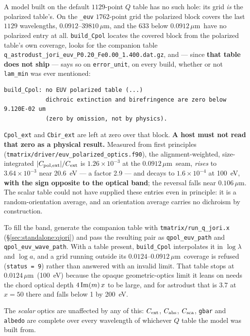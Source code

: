 \documentclass{my_memo}
\newcommand{\code}[1]{\texttt{#1}}
\newcommand{\um}{\ensuremath{\,\mu\mathrm{m}}}
\begin{document}
A model built on the default $1129$-point $Q$ table has no such hole: its grid
\emph{is} the polarized table's. On the \code{\_euv} $1762$-point grid the
polarized block covers the last
$1129$ wavelengths, $0.0912$--$39810$\um, and the $633$ below $0.0912$\um\ have
no polarized entry at all. \code{build\_Cpol} locates the covered block from the
polarized table's own coverage, looks for the companion table
\code{q\_astrodust\_jori\_euv\_P0.20\_Fe0.00\_1.400.dat.gz}, and --- since
\textbf{that table does not ship} --- says so on \code{error\_unit}, on every
build, whether or not \code{lam\_min} was ever mentioned:
\begin{lstlisting}[style=sh]
build_Cpol: no EUV polarized table (...)
            dichroic extinction and birefringence are zero below 9.120E-02 um
            (zero by omission, not by physics).
\end{lstlisting}
\code{Cpol\_ext} and \code{Cbir\_ext} are left at zero over that block.
\textbf{A host must not read that zero as a physical result.} Measured from
first principles (\code{tmatrix/driver/euv\_polarized\_optics.f90}), the
alignment-weighted, size-integrated $|C_{\rm pol,ext}|/C_{\rm ext}$ is
$1.26\times10^{-3}$ at the $0.0912$\um\ seam, \emph{rises} to
$3.64\times10^{-3}$ near \SI{20.6}{\electronvolt} --- a factor 2.9 --- and
decays to $1.6\times10^{-4}$ at \SI{100}{\electronvolt}, \textbf{with the sign
opposite to the optical band}; the reversal falls near $0.106$\um. The scalar
table could not have supplied these entries even in principle: it is a
random-orientation average, and an orientation average carries no dichroism by
construction.

To fill the band, generate the companion table with
\code{tmatrix/run\_q\_jori.x} (\S\ref{sec:standalone:qjori}) and pass the
resulting pair as \code{qpol\_euv\_path} and \code{qpol\_euv\_wave\_path}. With
a table present, \code{build\_Cpol} interpolates it in $\log\lambda$ and
$\log a$, and a grid running outside its $0.0124$--$0.0912$\um\ coverage is
refused (\code{status = 9}) rather than answered with an invalid limit. That
table stops at $0.0124$\um\ (\SI{100}{\electronvolt}) because the opaque
geometric-optics limit it leans on needs the chord optical depth
$4\,{\rm Im}(m)\,x$ to be large, and for astrodust that is $3.7$ at $x = 50$
there and falls below 1 by \SI{200}{\electronvolt}.

The \emph{scalar} optics are unaffected by any of this: $C_{\rm ext}$,
$C_{\rm abs}$, $C_{\rm sca}$, \code{gbar} and \code{albedo} are complete over
every wavelength of whichever $Q$ table the model was built from.
\end{document}
